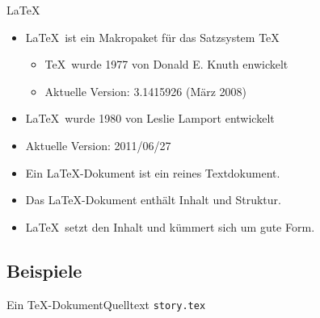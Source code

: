 
\begin{Frame}{\LaTeX}
  \begin{itemize}
    \item \LaTeX\ ist ein Makropaket für das Satzsystem \TeX
      \begin{itemize}
        \item \TeX\ wurde 1977 von Donald E. Knuth enwickelt
        \item Aktuelle Version: 3.1415926 (März 2008)
      \end{itemize}
    \item \LaTeX\ wurde 1980 von Leslie Lamport entwickelt
    \item Aktuelle Version: 2011/06/27
  \end{itemize}

  \xxx
  \pause

  \begin{itemize}
    \item Ein \LaTeX-Dokument ist ein \alert{reines Textdokument}.
    \item Das \LaTeX-Dokument enthält \alert{Inhalt und Struktur}.
    \item \LaTeX\ setzt den Inhalt und kümmert sich um \alert{gute Form}.
  \end{itemize}
\end{Frame}

\subsection{Beispiele}

\begin{Frame}{Ein \TeX-Dokument}{Quelltext \texttt{story.tex}}
  
\end{Frame}

